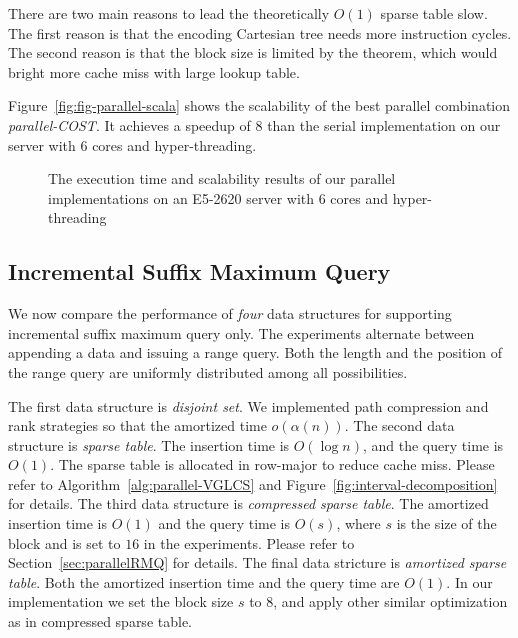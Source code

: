 
There are two main reasons to lead the theoretically $O(1)$ sparse table
slow. The first reason is that the encoding Cartesian tree needs more
instruction cycles.  The second reason is that the block size is limited
by the theorem, which would bright more cache miss with large lookup
table.

Figure~\ref{fig:fig-parallel-scala} shows the scalability of the best
parallel combination {\em parallel-COST}.  It achieves a speedup of
$8$ than the serial implementation on our server with 6 cores and
hyper-threading.

\begin{figure}
  \centering
  \caption{The execution time and scalability results of our parallel
    implementations on an E5-2620 server with 6 cores and
    hyper-threading}
\end{figure}


\subsection{Incremental Suffix Maximum Query}

We now compare the performance of {\em four} data structures for
supporting incremental suffix maximum query only.  The experiments
alternate between appending a data and issuing a range query.  Both
the length and the position of the range query are uniformly
distributed among all possibilities.

The first data structure is {\em disjoint set}.  We implemented path
compression and rank strategies so that the amortized time
$o(\alpha(n))$.  The second data structure is {\em sparse table}.  The
insertion time is $O(\log n)$, and the query time is $O(1)$.  The
sparse table is allocated in row-major to reduce cache miss.  Please
refer to Algorithm~\ref{alg:parallel-VGLCS} and
Figure~\ref{fig:interval-decomposition} for details.  The third data
structure is {\em compressed sparse table}.  The amortized insertion
time is $O(1)$ and the query time is $O(s)$, where $s$ is the size of
the block and is set to $16$ in the experiments.  Please refer to
Section~\ref{sec:parallelRMQ} for details.  The final data stricture
is {\em amortized sparse table}.  Both the amortized insertion time
and the query time are $O(1)$.  In our implementation we set the block
size $s$ to $8$, and apply other similar optimization as in compressed
sparse table.

